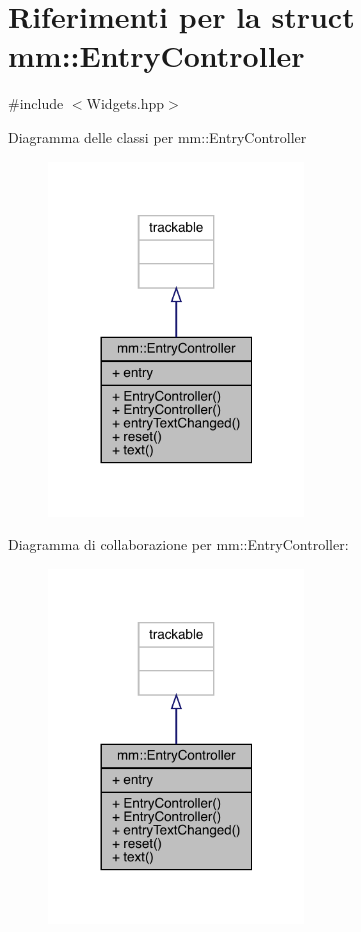 \hypertarget{structmm_1_1_entry_controller}{}\section{Riferimenti per la struct mm\+:\+:Entry\+Controller}
\label{structmm_1_1_entry_controller}


{\ttfamily \#include $<$Widgets.\+hpp$>$}



Diagramma delle classi per mm\+:\+:Entry\+Controller\nopagebreak
\begin{figure}[H]
\begin{center}
\leavevmode
\includegraphics[width=192pt]{d1/d7d/structmm_1_1_entry_controller__inherit__graph}
\end{center}
\end{figure}


Diagramma di collaborazione per mm\+:\+:Entry\+Controller\+:\nopagebreak
\begin{figure}[H]
\begin{center}
\leavevmode
\includegraphics[width=192pt]{db/db6/structmm_1_1_entry_controller__coll__graph}
\end{center}
\end{figure}
